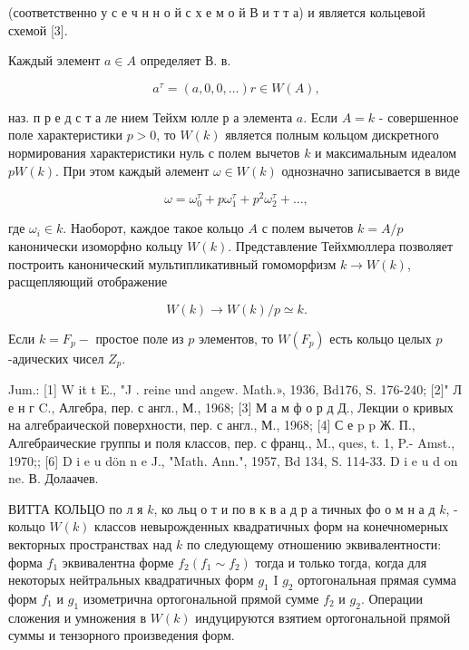 \documentclass[10pt]{article}
\begin{document}
(соответственно у с е ч н н о й с х е м о й В и т т а) и является кольцевой схемой [3].



Каждый элемент $a \in A$ определяет В. в.



\[

a^{\tau}=(a, 0,0, \ldots) r \in W(A),

\]



наз. п р е д с т а ле нием Тейхм юлле р а элемента $a$. Если $A=k$ - совершенное поле характеристики $p>0$, то $W(k)$ является полным кольцом дискретного нормирования характеристики нуль с полем вычетов $k$ и максимальным идеалом $p W(k)$. При этом каждый әлемент $\omega \in W(k)$ однозначно записывается в виде



\[

\omega=\omega_{0}^{\tau}+p \omega_{1}^{\tau}+p^{2} \omega_{2}^{\tau}+\ldots,

\]



где $\omega_{i} \in k$. Наоборот, каждое такое кольцо $A$ с полем вычетов $k=A / p$ канонически изоморфно кольцу $W(k)$. Представление Тейхмюллера позволяет построить канонический мультипликативный гомоморфизм $k \rightarrow W(k)$, расщепляющий отображение



\[

W(k) \longrightarrow W(k) / p \simeq k .

\]



Если $k=F_{p}-$ простое поле из $p$ элементов, то $W\left(F_{p}\right)$ есть кольцо целых $p$-адических чисел $Z_{p}$.



Jum.: [1] W it t E., "J . reine und angew. Math.», 1936, $\mathrm{Bd} 176$, S. 176-240; [2]" Л е н г C., Алгебра, пер. с англ., М., 1968; [3] М а м ф о р д Д., Лекции о кривых на алгебраической поверхности, пер. с англ., М., 1968; [4] С е p p Ж. П., Алгебраические группы и поля классов, пер. с франц., M., ques, t. 1, P.- Amst., 1970;; [6] D i e u dön n e J., "Math. Ann.", 1957, Bd 134, S. 114-33. D i e u d on ne. В. Долаачев.



ВИТТА КОЛЬЦО по л я $k$, ко льц о т и по в к в а д р а тичных фо о м н а д $k$, - кольцо $W(k)$ классов невырожденных квадратичных форм на конечномерных векторных пространствах над $k$ по следующему отношению эквивалентности: форма $f_{1}$ эквивалентна форме $f_{2}\left(f_{1} \sim f_{2}\right)$ тогда и только тогда, когда для некоторых нейтральных квадратичных форм $g_{1}$ I $g_{2}$ ортогональная прямая сумма форм $f_{1}$ и $g_{1}$ изометрична ортогональной прямой сумме $f_{2}$ и $g_{2}$. Операции сложения и умножения в $W(k)$ индуцируются взятием ортогональной прямой суммы и тензорного произведения форм.
\end{document}
